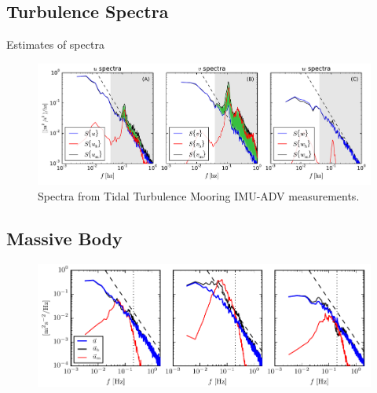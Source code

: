 \documentclass[twocol]{ametsoc}
\begin{document}
\subsection{Turbulence Spectra}

Estimates of spectra 

\begin{figure}[t]
  \centering
  \includegraphics[width=6in]{SpecFig02_annot}
  \caption{Spectra from Tidal Turbulence Mooring IMU-ADV measurements. }
  \label{fig:spec01}
\end{figure}

\subsection{Massive Body}

\begin{figure}[t]
  \centering
  \includegraphics{SM_spec_filt5s}
\end{figure}



\end{document}
